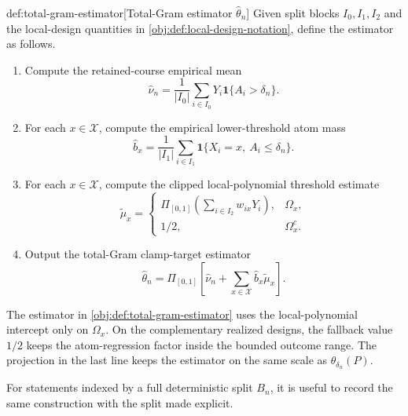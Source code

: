 \documentclass[11pt]{article}
\begin{document}
\begin{algorithmv}{def:total-gram-estimator}[Total-Gram estimator \(\widehat\theta_n\)]
Given split blocks \(I_0,I_1,I_2\) and the local-design quantities in \cref{obj:def:local-design-notation}, define the estimator as follows.
\begin{enumerate}
\item Compute the retained-course empirical mean
\[
\widehat\nu_n
=
\frac{1}{|I_0|}
\sum_{i\in I_0}Y_i\mathbf 1\{A_i>\delta_n\}.
\]
\item For each \(x\in\mathcal X\), compute the empirical lower-threshold atom mass
\[
\widehat b_x
=
\frac{1}{|I_1|}
\sum_{i\in I_1}\mathbf 1\{X_i=x,\ A_i\leq\delta_n\}.
\]
\item For each \(x\in\mathcal X\), compute the clipped local-polynomial threshold estimate
\[
\widetilde\mu_x
=
\begin{cases}
\Pi_{[0,1]}\!\left(\sum_{i\in I_2}w_{ix}Y_i\right),& \Omega_x,\\
1/2,& \Omega_x^{c}.
\end{cases}
\]
\item Output the total-Gram clamp-target estimator
\[
\widehat\theta_n
=
\Pi_{[0,1]}\!\left[
\widehat\nu_n+\sum_{x\in\mathcal X}\widehat b_x\widetilde\mu_x
\right].
\]
\end{enumerate}
\end{algorithmv}

The estimator  in \cref{obj:def:total-gram-estimator} uses the local-polynomial intercept only on \(\Omega_x\). On the complementary realized designs, the fallback value \(1/2\) keeps the atom-regression factor inside the bounded outcome range. The projection in the last line keeps the estimator on the same scale as \(\theta_{\delta_n}(P)\).

For statements indexed by a full deterministic split \(B_n\), it is useful to record the same construction with the split made explicit.
\end{document}
